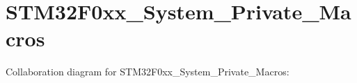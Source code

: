 \hypertarget{group___s_t_m32_f0xx___system___private___macros}{}\section{S\+T\+M32\+F0xx\+\_\+\+System\+\_\+\+Private\+\_\+\+Macros}
\label{group___s_t_m32_f0xx___system___private___macros}
Collaboration diagram for S\+T\+M32\+F0xx\+\_\+\+System\+\_\+\+Private\+\_\+\+Macros\+:
